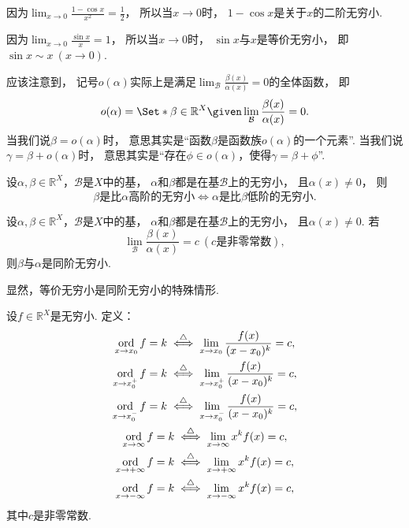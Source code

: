 \begin{example}
因为\(\lim_{x\to0} \frac{1-\cos x}{x^2} = \frac{1}{2}\)，
所以当\(x\to0\)时，
\(1-\cos x\)是关于\(x\)的二阶无穷小.
\end{example}

\begin{example}
因为\(\lim_{x\to0} \frac{\sin x}{x} = 1\)，
所以当\(x\to0\)时，
\(\sin x\)与\(x\)是等价无穷小，
即\(\sin x \sim x\ (x\to0)\).
\end{example}

\begin{remark}
应该注意到，
记号\(o(\alpha)\)实际上是满足\(\lim_\mathcal{B} \frac{\beta(x)}{\alpha(x)} = 0\)的全体函数，
即\[
	o(\alpha) = \Set*{ \beta\in\mathbb{R}^X \given \lim_\mathcal{B} \frac{\beta(x)}{\alpha(x)} = 0 }.
\]
当我们说\(\beta = o(\alpha)\)时，
意思其实是“函数\(\beta\)是函数族\(o(\alpha)\)的一个元素”.
当我们说\(\gamma = \beta + o(\alpha)\)时，
意思其实是“存在\(\phi\in o(\alpha)\)，使得\(\gamma = \beta + \phi\)”.
\end{remark}

\begin{proposition}
设\(\alpha,\beta\in\mathbb{R}^X\)，\(\mathcal{B}\)是\(X\)中的基，
\(\alpha\)和\(\beta\)都是在基\(\mathcal{B}\)上的无穷小，
且\(\alpha(x)\neq0\)，
则\[
	\text{\(\beta\)是比\(\alpha\)高阶的无穷小}
	\iff
	\text{\(\alpha\)是比\(\beta\)低阶的无穷小}.
\]
\end{proposition}

\begin{proposition}
设\(\alpha,\beta\in\mathbb{R}^X\)，\(\mathcal{B}\)是\(X\)中的基，
\(\alpha\)和\(\beta\)都是在基\(\mathcal{B}\)上的无穷小，
且\(\alpha(x)\neq0\).
若\[
	\lim_\mathcal{B} \frac{\beta(x)}{\alpha(x)} = c\ (\text{$c$是非零常数}),
\]
则\(\beta\)与\(\alpha\)是同阶无穷小.
\end{proposition}

\begin{remark}
显然，等价无穷小是同阶无穷小的特殊情形.
\end{remark}

\begin{definition}
设\(f\in\mathbb{R}^X\)是无穷小.
定义：\begin{gather*}
	\operatorname*{ord}_{x \to x_0} f = k
	\overset{\triangle}{\iff}
	\lim_{x \to x_0} \frac{f(x)}{(x-x_0)^k} = c, \\
	\operatorname*{ord}_{x \to x_0^+} f = k
	\overset{\triangle}{\iff}
	\lim_{x \to x_0^+} \frac{f(x)}{(x-x_0)^k} = c, \\
	\operatorname*{ord}_{x \to x_0^-} f = k
	\overset{\triangle}{\iff}
	\lim_{x \to x_0^-} \frac{f(x)}{(x-x_0)^k} = c, \\
	\operatorname*{ord}_{x \to \infty} f = k
	\overset{\triangle}{\iff}
	\lim_{x \to \infty} x^k f(x) = c, \\
	\operatorname*{ord}_{x \to +\infty} f = k
	\overset{\triangle}{\iff}
	\lim_{x \to +\infty} x^k f(x) = c, \\
	\operatorname*{ord}_{x \to -\infty} f = k
	\overset{\triangle}{\iff}
	\lim_{x \to -\infty} x^k f(x) = c,
\end{gather*}
其中\(c\)是非零常数.
\end{definition}

